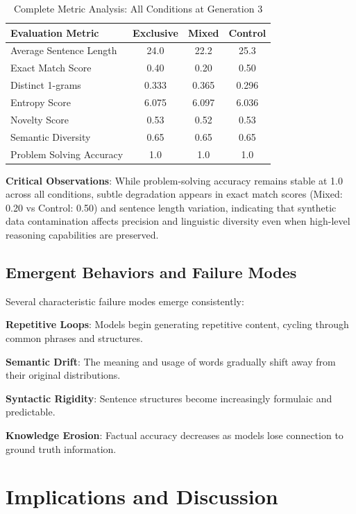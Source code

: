 \documentclass{article}
\begin{document}
\begin{table}[h]
\centering
\caption{Complete Metric Analysis: All Conditions at Generation 3}
\label{tab:detailed_metrics}
\begin{tabular}{lccc}
\toprule
\textbf{Evaluation Metric} & \textbf{Exclusive} & \textbf{Mixed} & \textbf{Control} \\
\midrule
Average Sentence Length & 24.0 & 22.2 & 25.3 \\
Exact Match Score & 0.40 & 0.20 & 0.50 \\
Distinct 1-grams & 0.333 & 0.365 & 0.296 \\
Entropy Score & 6.075 & 6.097 & 6.036 \\
Novelty Score & 0.53 & 0.52 & 0.53 \\
Semantic Diversity & 0.65 & 0.65 & 0.65 \\
Problem Solving Accuracy & 1.0 & 1.0 & 1.0 \\
\bottomrule
\end{tabular}
\end{table}

\textbf{Critical Observations}: While problem-solving accuracy remains stable at 1.0 across all conditions, subtle degradation appears in exact match scores (Mixed: 0.20 vs Control: 0.50) and sentence length variation, indicating that synthetic data contamination affects precision and linguistic diversity even when high-level reasoning capabilities are preserved.

\subsection{Emergent Behaviors and Failure Modes}

Several characteristic failure modes emerge consistently:

\textbf{Repetitive Loops}: Models begin generating repetitive content, cycling through common phrases and structures.

\textbf{Semantic Drift}: The meaning and usage of words gradually shift away from their original distributions.

\textbf{Syntactic Rigidity}: Sentence structures become increasingly formulaic and predictable.

\textbf{Knowledge Erosion}: Factual accuracy decreases as models lose connection to ground truth information.

\section{Implications and Discussion}
\end{document}
